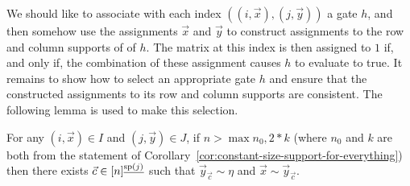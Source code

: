 \documentclass[../paper.tex]{subfiles}
\begin{document}
We should like to associate with each index $((i, \vec{x}), (j, \vec{y}))$ a
gate $h$, and then somehow use the assignments $\vec{x}$ and $\vec{y}$ to
construct assignments to the row and column supports of of $h$. The matrix at
this index is then assigned to $1$ if, and only if, the combination of these
assignment causes $h$ to evaluate to true. It remains to show how to select an
appropriate gate $h$ and ensure that the constructed assignments to its row and
column supports are consistent. The following lemma is used to make this
selection.

\begin{lem}
	\label{lem:permutation-row-column}
	For any $(i, \vec{x}) \in I$ and $(j, \vec{y}) \in J$, if $n > \max{n_0, 2*k}$
  (where $n_0$ and $k$ are both from the statement of
  Corollary~\ref{cor:constant-size-support-for-everything}) then there exists
  $\vec{c} \in [n]^{\underline{\text{sp}(j)}}$ such that $\vec{y}_{\vec{c}} \sim
  \eta$ and $\vec{x} \sim \vec{y}_{\vec{c}}$.
\end{lem}
\end{document}
